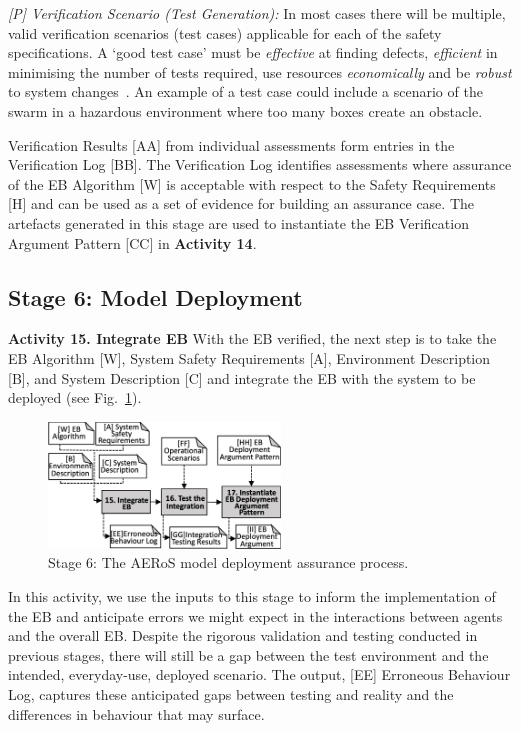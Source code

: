\documentclass{article}
\begin{document}
\emph{[P] Verification Scenario (Test Generation):} In most cases there will be multiple, valid verification scenarios (test cases) applicable for each of the safety specifications. 
A `good test case' must be \emph{effective} at finding defects, \emph{efficient} in minimising the number of tests required, use resources \emph{economically} and be \emph{robust} to system changes~\cite{Fewster1999}. 
An example of a test case could include a scenario of the swarm in a hazardous environment where too many boxes create an obstacle.

Verification Results [AA] from individual assessments form entries in the Verification Log [BB]. The Verification Log identifies assessments where assurance of the EB Algorithm [W] is acceptable with respect to the Safety Requirements [H] and can be used as a set of evidence for building an assurance case. 
The artefacts generated in this stage are used to instantiate the EB Verification Argument Pattern [CC] in \textbf{Activity 14}.

\subsection{Stage 6: Model Deployment} \label{framework-stage6}
\noindent\textbf{Activity 15. Integrate EB} With the EB verified, the next step is to take the EB Algorithm [W], System Safety Requirements [A], Environment Description [B], and System Description [C] and integrate the EB with the system to be deployed (see Fig.~\ref{aeros-stage6}). 
\begin{figure}[!h]
	\centering
	\includegraphics[width=0.55\textwidth]{AERoS-Stage6.pdf}
	\caption{Stage 6: The AERoS model deployment assurance process.}
	\label{aeros-stage6}
\end{figure}

In this activity, we use the inputs to this stage to inform the implementation of the EB and anticipate errors we might expect in the interactions between agents and the overall EB. Despite the rigorous validation and testing conducted in previous stages, there will still be a gap between the test environment and the intended, everyday-use, deployed scenario. The output, [EE] Erroneous Behaviour Log, captures these anticipated gaps between testing and reality and the differences in behaviour that may surface. 
\end{document}
